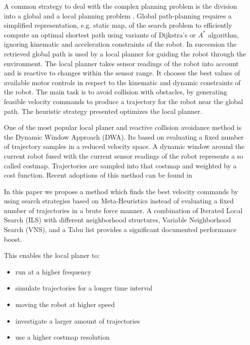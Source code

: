 A common strategy to deal with the complex planning problem is the division into a global and a local planning problem \cite{LaValle2006}.
Global path-planning requires a simplified representation, e.g. static map, of the search problem to efficiently compute an optimal shortest path using variants of Dijkstra's \cite{dijkstra1959note} or $A^*$ \cite{DBLP:journals/tssc/HartNR68/Astar} algorithm, ignoring kinematic and acceleration constraints of the robot.
In succession the retrieved global path is used by a local planner for guiding the robot through the environment.
The local planner takes sensor readings of the robot into account and is reactive to changes within the sensor range. 
It chooses the best values of available motor controls in respect to the kinematic and dynamic constraints of the robot. 
The main task is to avoid collision with obstacles, by generating feasible velocity commands to produce a trajectory for the robot near the global path.
The heuristic strategy presented optimizes the local planner.   

One of the most popular local planer and reactive collision avoidance method is the Dynamic Window Approach (DWA)\cite{DWA1997}. Its based on evaluating a fixed number of trajectory samples in a reduced velocity space. 
A dynamic window around the current robot fused with the current sensor readings of the robot represents a so called costmap.
Trajectories are sampled into that costmap and weighted by a cost function.
Recent adoptions of this method can be found in \cite{conf/icra/SederP07}\cite{DBLP:conf/icra/Marder-EppsteinBFGK10}

In this paper we propose a method which finds the best velocity commands by using search strategies based on Meta-Heuristics instead of evaluating a fixed number of trajectories in a brute force manner.
A combination of Iterated Local Search (ILS) with different neighborhood structures, Variable Neighborhood Search (VNS), and a Tabu list provides a significant documented performance boost. 

This enables the local planer to:
\begin{itemize}
\item run at a higher frequency
\item simulate trajectories for a longer time interval
\item moving the robot at higher speed
\item investigate a larger amount of trajectories
\item use a higher costmap resolution
\end{itemize}

